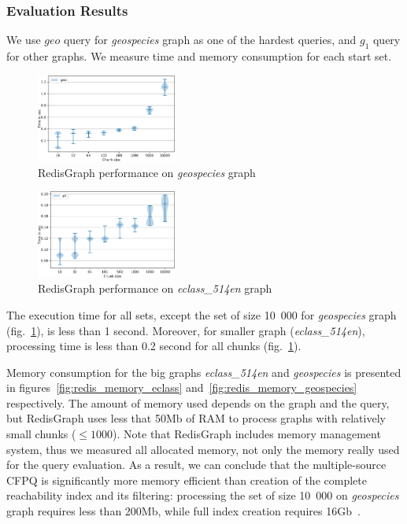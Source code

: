 \subsubsection{Evaluation Results}

We use $geo$ query for \textit{geospecies} graph as one of the hardest queries, and $g_1$ query for other graphs.
We measure time and memory consumption for each start set.

\begin{figure}[h]
\centering
\includegraphics[width=0.41\textwidth]{data/raw_redis/geospecies.pdf}
\caption{RedisGraph performance on \textit{geospecies} graph}
\label{fig:redis_geospecies_all}
\end{figure}

\begin{figure}[h]
\centering
\includegraphics[width=0.41\textwidth]{data/raw_redis/eclass_514en.pdf}
\caption{RedisGraph performance on \textit{eclass\_514en} graph}
\label{fig:redis_eclass_all}
\end{figure}

The execution time for all sets, except the set of size 10~000 for \textit{geospecies} graph (fig.~\ref{fig:redis_geospecies_all}), is less than 1 second.
Moreover, for smaller graph (\textit{eclass\_514en}), processing time is less than 0.2 second for all chunks (fig.~\ref{fig:redis_geospecies_all}).

Memory consumption for the big graphs \textit{eclass\_514en} and \textit{geospecies} is presented in figures~\ref{fig:redis_memory_eclass} and~\ref{fig:redis_memory_geospecies} respectively.
The amount of memory used depends on the graph and the query, but RedisGraph uses less that 50Mb of RAM to process graphs with relatively small chunks ($\leq 1000$).
Note that RedisGraph includes memory management system, thus we measured all allocated memory, not only the memory really used for the query evaluation.
As a result, we can conclude that the multiple-source CFPQ is significantly more memory efficient than creation of the complete reachability index and its filtering: processing the set of size 10~000 on \textit{geospecies} graph requires less than 200Mb, while full index creation requires 16Gb~\cite{10.1145/3398682.3399163}.

